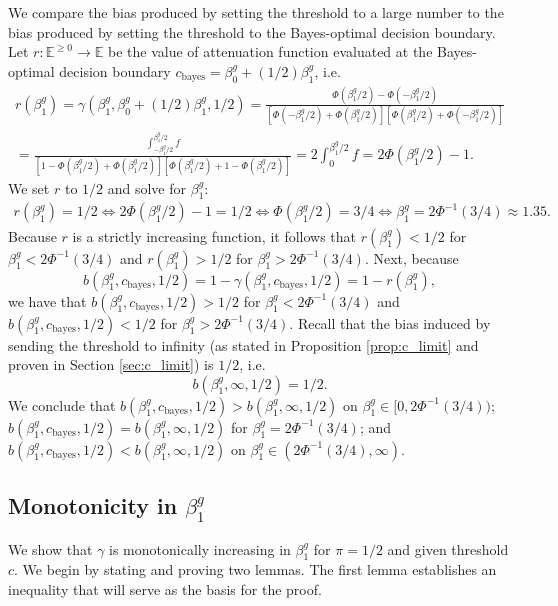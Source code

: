 \documentclass[12pt]{article}
\begin{document}
\begin{appendices}
\begin{refsection}
		We compare the bias produced by setting the threshold to a large number to the bias produced by setting the threshold to the Bayes-optimal decision boundary. Let $r: \mathbb{E}^{\geq 0} \to \mathbb{E}$ be the value of attenuation function evaluated at the Bayes-optimal decision boundary $c_\textrm{bayes} = \beta^g_0 + (1/2) \beta^g_1$, i.e.
		\begin{multline*}
		r(\beta^g_1) = \gamma(\beta^g_1, \beta^g_0 + (1/2)\beta^g_1, 1/2) = \frac{\Phi(\beta^g_1/2) - \Phi(-\beta^g_1/2)}{\left[\Phi(-\beta^g_1/2) + \Phi( \beta^g_1/2) \right] \left[\Phi(\beta^g_1/2) + \Phi( -\beta^g_1/2)\right]} \\ = \frac{\int_{-\beta^g_1/2}^{\beta^g_1/2} f}{\left[ 1 - \Phi(\beta^g_1/2) + \Phi(\beta^g_1/2) \right]\left[ \Phi(\beta^g_1/2) + 1 - \Phi(\beta^g_1/2) \right]} = 2 \int_{0}^{\beta^g_1/2} f = 2 \Phi(\beta^g_1/2) - 1.
		\end{multline*}
		We set $r$ to $1/2$ and solve for $\beta^g_1$:
		\begin{multline*}
		r(\beta^g_1) = 1/2 \iff 2\Phi(\beta^g_1/2) -1 = 1/2 \iff \Phi(\beta^g_1/2) = 3/4 \iff \beta^g_1 = 2 \Phi^{-1}(3/4) \approx 1.35.
		\end{multline*}
		Because $r$ is a strictly increasing function, it follows that $r(\beta^g_1) < 1/2$ for $\beta^g_1 < 2\Phi^{-1}(3/4)$ and $r(\beta^g_1) > 1/2$ for $\beta^g_1 > 2\Phi^{-1}(3/4).$ Next, because $$b(\beta^g_1, c_\textrm{bayes}, 1/2) = 1 - \gamma(\beta^g_1, c_\textrm{bayes}, 1/2) = 1 - r(\beta^g_1),$$ we have that $b(\beta^g_1, c_\textrm{bayes}, 1/2) > 1/2$ for $\beta^g_1 < 2 \Phi^{-1}(3/4)$ and $b(\beta^g_1, c_\textrm{bayes}, 1/2) < 1/2$ for $\beta^g_1 > 2 \Phi^{-1}(3/4)$. Recall that the bias induced by sending the threshold to infinity (as stated in Proposition \ref{prop:c_limit} and proven in Section \ref{sec:c_limit}) is $1/2$, i.e. $$b(\beta^g_1, \infty, 1/2) = 1/2.$$ We conclude that $b(\beta^g_1, c_\textrm{bayes},1/2) > b(\beta^g_1, \infty, 1/2)$ on $\beta^g_1 \in [0, 2\Phi^{-1}(3/4))$; $b(\beta^g_1, c_\textrm{bayes},1/2) = b(\beta^g_1, \infty, 1/2)$ for $\beta^g_1 = 2\Phi^{-1}(3/4)$; and $b(\beta^g_1, c_\textrm{bayes},1/2) < b(\beta^g_1, \infty, 1/2)$ on $\beta^g_1 \in (2\Phi^{-1}(3/4), \infty)$.
		
		\subsection{Monotonicity in $\beta^g_1$}\label{sec:monotone}
		We show that $\gamma$ is monotonically increasing in $\beta^g_1$ for $\pi = 1/2$ and given threshold $c$. We begin by stating and proving two lemmas. The first lemma establishes an inequality that will serve as the basis for the proof.
		

\end{refsection}
\end{appendices}
\end{document}
